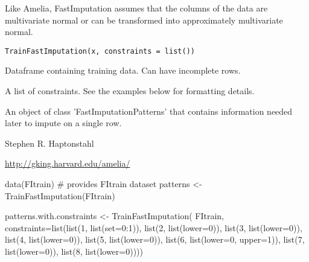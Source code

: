 \documentclass[a4paper]{book}
\begin{document}
%
\begin{Description}\relax
Like Amelia, FastImputation assumes that the columns of the data are
multivariate normal or can be transformed into approximately
multivariate normal.
\end{Description}
%
\begin{Usage}
\begin{verbatim}
TrainFastImputation(x, constraints = list())
\end{verbatim}
\end{Usage}
%
\begin{Arguments}
\begin{ldescription}
\item[\code{x}] Dataframe containing training data. Can have incomplete rows.

\item[\code{constraints}] A list of constraints.  See the examples below for formatting details.
\end{ldescription}
\end{Arguments}
%
\begin{Value}
An object of class 'FastImputationPatterns' that contains
information needed later to impute on a single row.
\end{Value}
%
\begin{Author}\relax
Stephen R. Haptonstahl 
\end{Author}
%
\begin{References}\relax
\url{http://gking.harvard.edu/amelia/}
\end{References}
%
\begin{SeeAlso}\relax
{}
\end{SeeAlso}
%
\begin{Examples}
\begin{ExampleCode}

data(FItrain)   # provides FItrain dataset
patterns <- TrainFastImputation(FItrain)

patterns.with.constraints <- TrainFastImputation(
  FItrain,
  constraints=list(list(1, list(set=0:1)),
                   list(2, list(lower=0)),
                   list(3, list(lower=0)),
                   list(4, list(lower=0)),
                   list(5, list(lower=0)),
                   list(6, list(lower=0, upper=1)),
                   list(7, list(lower=0)),
                   list(8, list(lower=0))))
\end{ExampleCode}
\end{Examples}
\end{document}

